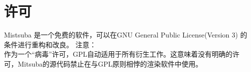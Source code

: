 \chapter{许可}
Mistsuba 是一个免费的软件，可以在GNU General Public License(Version 3) 的条件进行重构和改良。
\newline
注意：
\\
作为一个“病毒”许可，GPL自动适用于所有衍生工作。这意味着没有明确的许可，Mitsuba的源代码禁止在与GPL原则相悖的渲染软件中使用。


